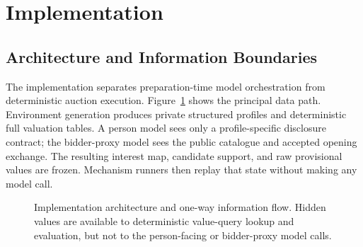 \section{Implementation}

\subsection{Architecture and Information Boundaries}

The implementation separates preparation-time model orchestration from
deterministic auction execution. Figure~\ref{fig:system-architecture} shows the
principal data path. Environment generation produces private structured
profiles and deterministic full valuation tables. A person model sees only a
profile-specific disclosure contract; the bidder-proxy model sees the public
catalogue and accepted opening exchange. The resulting interest map,
candidate support, and raw provisional values are frozen. Mechanism runners
then replay that state without making any model call.

\begin{figure}[htbp]
\centering
{}
\caption{Implementation architecture and one-way information flow. Hidden
values are available to deterministic value-query lookup and evaluation, but
not to the person-facing or bidder-proxy model calls.}
\label{fig:system-architecture}
\end{figure}

